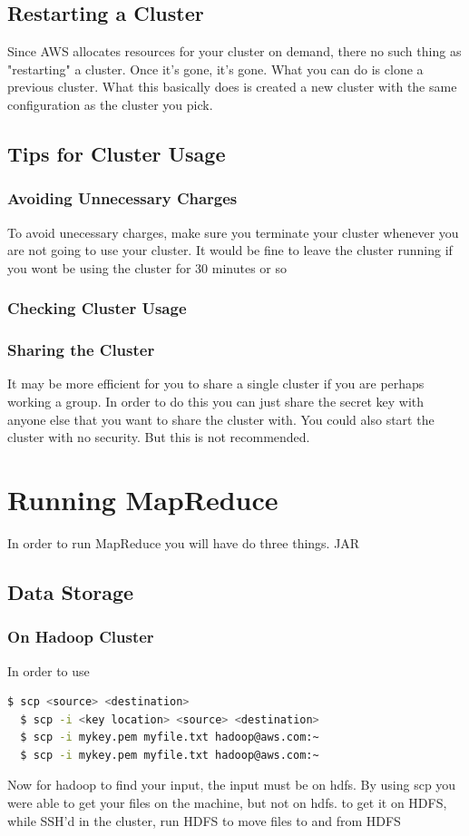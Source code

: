 \documentclass{article}
\begin{document}
\subsection{Restarting a Cluster}
Since AWS allocates resources for your cluster on demand, there no such thing as "restarting" a cluster. Once it's gone, it's gone. What you can do is clone a previous cluster. What this basically does is created a new cluster with the same configuration as the cluster you pick.
\subsection{Tips for Cluster Usage}
\subsubsection{Avoiding Unnecessary Charges}
To avoid unecessary charges, make sure you terminate your cluster whenever you are not going to use your cluster. It would be fine to leave the cluster running if you wont be using the cluster for 30 minutes or so
\subsubsection{Checking Cluster Usage}
\subsubsection{Sharing the Cluster}
It may be more efficient for you to share a single cluster if you are perhaps working a group. In order to do this you can just share the secret key with anyone else that you want to share the cluster with. You could also start the cluster with no security. But this is not recommended.



\section{Running MapReduce}
In order to run MapReduce you will have do three things. JAR
\subsection{Data Storage}
\subsubsection{On Hadoop Cluster}
In order to use
\begin{lstlisting}[language=bash]
  $ scp <source> <destination>
  $ scp -i <key location> <source> <destination>
  $ scp -i mykey.pem myfile.txt hadoop@aws.com:~
  $ scp -i mykey.pem myfile.txt hadoop@aws.com:~
\end{lstlisting}
Now for hadoop to find your input, the input must be on hdfs. By using scp you were able to get your files on the machine, but not on hdfs. to get it on HDFS, while SSH'd in the cluster, run HDFS to move files to and from HDFS
\end{document}
